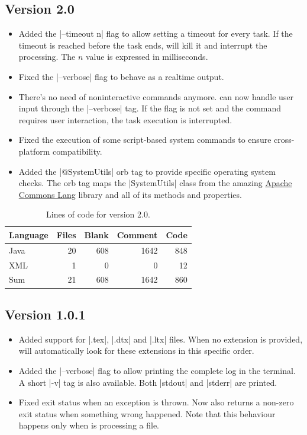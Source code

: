 \documentclass[a4paper,twoside,12pt]{memoir}
\begin{document}
\subsection*{Version 2.0}
\begin{itemize}
\item[\newfeature] 
     Added the |--timeout n| flag to allow setting a timeout for every task. If
     the timeout is reached before the task ends, \arara will kill it and 
     interrupt the processing. The $n$ value is expressed in milliseconds.
\item[\bugfix] 
     Fixed the |--verbose| flag to behave as a realtime output.
\item[\newfeature] 
     There's no need of noninteractive commands anymore. \arara can now handle
     user input through the |--verbose| tag. If the flag is not set and the 
     command requires user interaction, the task execution is interrupted.
\item[\bugfix] 
     Fixed the execution of some script-based system commands to ensure 
     cross-platform compatibility.
\item[\newfeature] 
     Added the |@{SystemUtils}| orb tag to provide specific operating system 
     checks. The orb tag maps the |SystemUtils| class from the amazing 
     \href{http://commons.apache.org/lang/}{Apache Commons Lang} library and 
     all of its methods and properties.
\end{itemize}

{\renewcommand{\arraystretch}{1.5}
\begin{table}[ht]
\centering
\caption{Lines of code for version 2.0.}
\begin{tabular}{lrrrr}
\hline
\textbf{Language} & \textbf{Files} & \textbf{Blank} & \textbf{Comment} & \textbf{Code}\\
\hline
\hline
Java & 20 & 608 & 1642 & 848\\
XML & 1 & 0 & 0 & 12\\
\hline
Sum & 21 & 608 & 1642 & 860\\
\hline
\end{tabular}
\label{tab:locarara20}
\end{table}}

\subsection*{Version 1.0.1}

\begin{itemize}
\item[\newfeature] 
     Added support for |.tex|, |.dtx| and |.ltx| files. When no extension is 
     provided, \arara will automatically look for these extensions in this 
     specific order.
\item[\newfeature] 
     Added the |--verbose| flag to allow printing the complete log in the 
     terminal. A short |-v| tag is also available. Both |stdout| and |stderr| 
     are printed.
\item[\bugfix] 
     Fixed exit status when an exception is thrown. Now \arara also returns a 
     non-zero exit status when something wrong happened. Note that this 
     behaviour happens only when \arara is processing a file.
\end{itemize}
\end{document}
